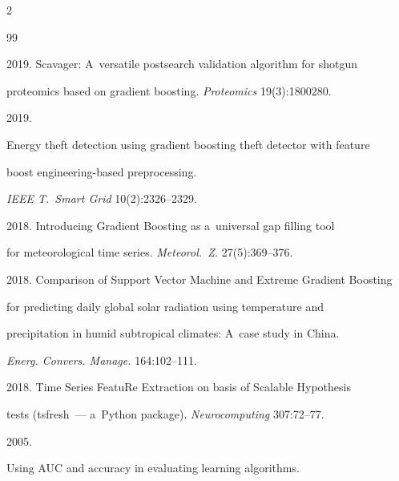 \begin{multicols}{2}
{{\begin{thebibliography}{99}


 2019. Scavager: A~versatile postsearch validation algorithm for shotgun 

 proteomics based on gradient boosting. \textit{Proteomics} 19(3):1800280.




 2019. 

Energy theft detection using gradient boosting theft detector with feature 

boost engineering-based preprocessing. 

\textit{IEEE T.~Smart Grid} 10(2):2326--2329.





 2018. Introducing Gradient Boosting as a~universal gap filling tool 

 for meteorological time series. \textit{Meteorol.~Z.} 27(5):369--376.





 2018. Comparison of Support Vector Machine and Extreme Gradient Boosting

  for predicting daily global solar radiation using temperature and 

  precipitation in humid subtropical climates: A~case study in China. 

\textit{Energ. Convers.  Manage.} 164:102--111.





 2018. Time Series FeatuRe Extraction on basis of Scalable Hypothesis 

 tests (tsfresh~--- a~Python package). \textit{Neurocomputing} 307:72--77.

  


 2005. 

Using AUC and accuracy in evaluating learning algorithms. 


\end{thebibliography}}}
\end{multicols}
